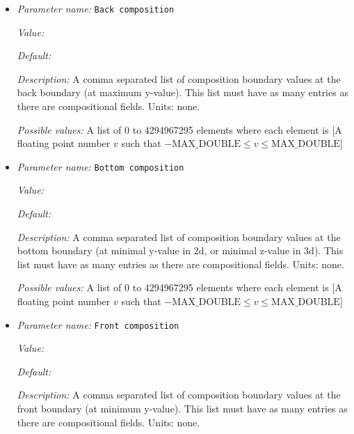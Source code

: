\begin{itemize}
\item {\it Parameter name:} {\tt Back composition}
\label{parameters:Boundary composition model/Box/Back composition}
\label{parameters:Boundary_20composition_20model/Box/Back_20composition}


{\it Value:} 


{\it Default:} 


{\it Description:} A comma separated list of composition boundary values at the back boundary (at maximum y-value). This list must have as many entries as there are compositional fields. Units: none.


{\it Possible values:} A list of 0 to 4294967295 elements where each element is [A floating point number $v$ such that $-\text{MAX\_DOUBLE} \leq v \leq \text{MAX\_DOUBLE}$]
\item {\it Parameter name:} {\tt Bottom composition}
\label{parameters:Boundary composition model/Box/Bottom composition}
\label{parameters:Boundary_20composition_20model/Box/Bottom_20composition}


{\it Value:} 


{\it Default:} 


{\it Description:} A comma separated list of composition boundary values at the bottom boundary (at minimal y-value in 2d, or minimal z-value in 3d). This list must have as many entries as there are compositional fields. Units: none.


{\it Possible values:} A list of 0 to 4294967295 elements where each element is [A floating point number $v$ such that $-\text{MAX\_DOUBLE} \leq v \leq \text{MAX\_DOUBLE}$]
\item {\it Parameter name:} {\tt Front composition}
\label{parameters:Boundary composition model/Box/Front composition}
\label{parameters:Boundary_20composition_20model/Box/Front_20composition}


{\it Value:} 


{\it Default:} 


{\it Description:} A comma separated list of composition boundary values at the front boundary (at minimum y-value). This list must have as many entries as there are compositional fields. Units: none.



\end{itemize}
